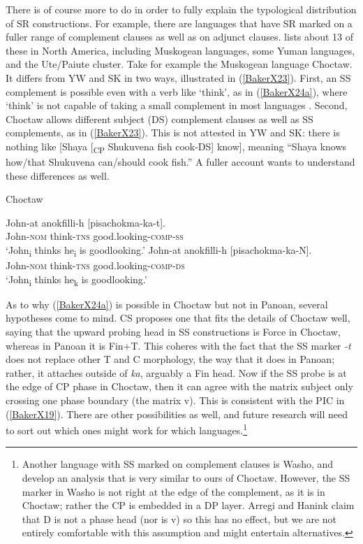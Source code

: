 \documentclass[output=paper,colorlinks,citecolor=brown,
]{langscibook}
\renewcommand{\sc}[1]{\textsc{#1}}
\begin{document}
There is of course more to do in order to fully explain the typological distribution of SR constructions. For example, there are languages that have SR marked on a fuller range of complement clauses as well as on adjunct clauses. \citet{mckenzie2015survey} lists about 13 of these in North America, including Muskogean languages, some Yuman languages, and the Ute/Paiute cluster. Take for example the Muskogean language Choctaw. It differs from YW and SK in two ways, illustrated in (\ref{BakerX23}). First, an SS complement is possible even with a verb like ‘think’, as in (\ref{BakerX24a}), where ‘think’ is not capable of taking a small complement in most languages \citep{wurmbrand2001infinitives}. Second, Choctaw allows different subject (DS) complement clauses as well as SS complements, as in (\ref{BakerX23}). This is not attested in YW and SK: there is nothing like [Shaya [\textsubscript{CP} Shukuvena fish cook-DS] know], meaning “Shaya knows how/that Shukuvena can/should cook fish.” A fuller account wants to understand these differences as well.

\begin{exe}
    \ex Choctaw \citep[269]{broadwell2006choctaw} \label{BakerX24}
	    \begin{xlist}
			\ex \label{BakerX24a}
			\gll John-at anokfilli-h [pisachokma-ka-t].\\
			    John-\sc{nom} think-\sc{tns} good.looking-\sc{comp-ss}\\
			    \glt `John\textsubscript{i} thinks he\textsubscript{i} is goodlooking.'
			\ex \label{BakerX24b}
			\gll John-at anokfilli-h [pisachokma-ka-N].\\
    			 John-\sc{nom} think-\sc{tns} good.looking-\sc{comp-ds}\\
			    \glt `John\textsubscript{i} thinks he\textsubscript{k} is goodlooking.'
		\end{xlist}
\end{exe}

As to why (\ref{BakerX24a}) is possible in Choctaw but not in Panoan, several hypotheses come to mind. CS proposes one that fits the details of Choctaw well, saying that the upward probing head in SS constructions is Force in Choctaw, whereas in Panoan it is Fin+T. This coheres with the fact that the SS marker \textit{-t} does not replace other T and C morphology, the way that it does in Panoan; rather, it attaches outside of \textit{ka}, arguably a Fin head. Now if the SS probe is at the edge of CP phase in Choctaw, then it can agree with the matrix subject only crossing one phase boundary (the matrix v). This is consistent with the PIC in (\ref{BakerX19}). There are other possibilities as well, and future research will need to sort out which ones might work for which languages.\footnote{Another language with SS marked on complement clauses is Washo, and \citet{arregi2019switch} develop an analysis that is very similar to ours of Choctaw. However, the SS marker in Washo is not right at the edge of the complement, as it is in Choctaw; rather the CP is embedded in a DP layer. Arregi and Hanink claim that D is not a phase head (nor is v) so this has no effect, but we are not entirely comfortable with this assumption and might entertain alternatives.}\\
\end{document}
